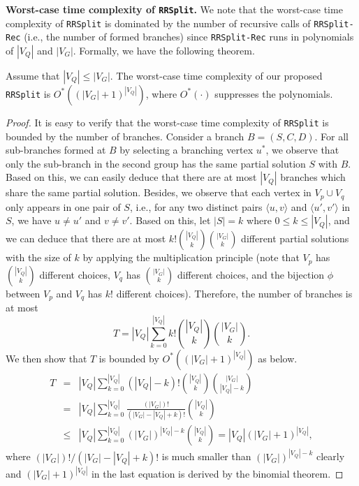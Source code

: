 \smallskip
\noindent\textbf{Worst-case time complexity of \texttt{RRSplit}.} We note that the worst-case time complexity of \texttt{RRSplit} is dominated by the number of recursive calls of \texttt{RRSplit-Rec} (i.e., the number of formed branches) since \texttt{RRSplit-Rec} runs in polynomials of $|V_Q|$ and $|V_G|$. Formally, we have the following theorem.
\begin{theorem}
    Assume that $|V_Q|\leq |V_G|$. The worst-case time complexity of our proposed \texttt{RRSplit}  is $O^*((|V_G|+1)^{|V_Q|})$, where $O^*(\cdot)$ suppresses the polynomials.
\end{theorem}
\begin{proof}
    It is easy to verify that the worst-case time complexity of \texttt{RRSplit} is bounded by the number of branches. Consider a branch $B=(S,C,D)$. For all sub-branches formed at $B$ by selecting a branching vertex $u^*$, we observe that only the sub-branch in the second group has the same partial solution $S$ with $B$. Based on this, we can easily deduce that there are at most $|V_Q|$ branches which share the same partial solution. Besides,  we observe that each vertex in $V_p\cup V_q$ only appears in one pair of $S$, i.e., for any two distinct pairs $\langle u,v \rangle$ and $\langle u',v' \rangle$ in $S$, we have $u\neq u'$ and $v\neq v'$. Based on this, let $|S|=k$ where $0\leq k\leq |V_Q|$, and we can deduce that there are at most $k!\binom{|V_Q|}{k}\binom{|V_G|}{k}$ different partial solutions with the size of $k$ by applying the multiplication principle (note that $V_p$ has $\binom{|V_Q|}{k}$ different choices, $V_q$ has $\binom{|V_G|}{k}$ different choices, and the bijection $\phi$ between $V_p$ and $V_q$ has $k!$ different choices). Therefore, the number of branches is at most
    \begin{equation}
       T=|V_Q| \sum_{k=0}^{|V_Q|} k! \binom{|V_Q|}{k}\binom{|V_G|}{k}.
    \end{equation}
    We then show that $T$ is bounded by $O^*((|V_G|+1)^{|V_Q|})$ as below.
    \begin{eqnarray}
       T&=&|V_Q| \sum_{k=0}^{|V_Q|} (|V_Q|-k)! \binom{|V_Q|}{k}\binom{|V_G|}{|V_Q|-k}\\
       &=&|V_Q| \sum_{k=0}^{|V_Q|} \frac{(|V_{G}|)!}{(|V_G|-|V_Q|+k)!}\binom{|V_Q|}{k}\\
       &\leq& |V_Q|\sum_{k=0}^{|V_Q|} (|V_G|)^{|V_Q|-k} \binom{|V_Q|}{k}=|V_Q|(|V_G|+1)^{|V_Q|},
    \end{eqnarray}
    where $(|V_{G}|)!/(|V_G|-|V_Q|+k)!$ is  much smaller than $(|V_G|)^{|V_Q|-k}$ clearly and $(|V_G|+1)^{|V_Q|}$ in the last equation is derived by the binomial theorem.
\end{proof}



